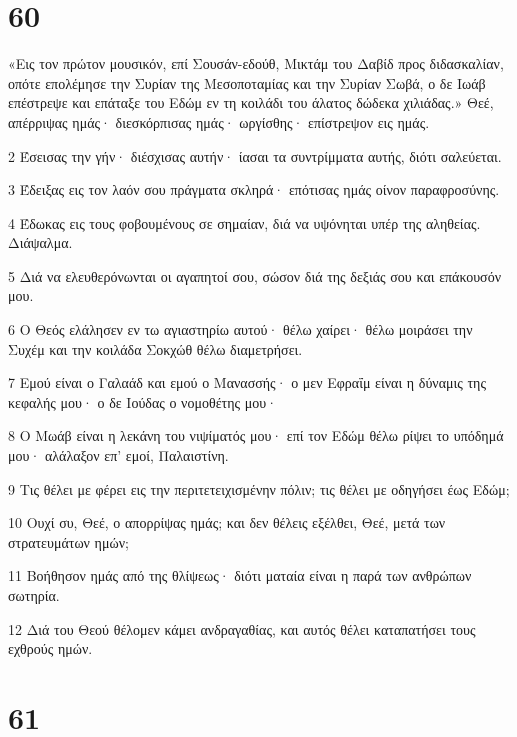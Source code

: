 \chapter{60}

\par «Εις τον πρώτον μουσικόν, επί Σουσάν-εδούθ, Μικτάμ του Δαβίδ προς διδασκαλίαν, οπότε επολέμησε την Συρίαν της Μεσοποταμίας και την Συρίαν Σωβά, ο δε Ιωάβ επέστρεψε και επάταξε του Εδώμ εν τη κοιλάδι του άλατος δώδεκα χιλιάδας.» Θεέ, απέρριψας ημάς· διεσκόρπισας ημάς· ωργίσθης· επίστρεψον εις ημάς.
\par 2 Έσεισας την γήν· διέσχισας αυτήν· ίασαι τα συντρίμματα αυτής, διότι σαλεύεται.
\par 3 Έδειξας εις τον λαόν σου πράγματα σκληρά· επότισας ημάς οίνον παραφροσύνης.
\par 4 Έδωκας εις τους φοβουμένους σε σημαίαν, διά να υψόνηται υπέρ της αληθείας. Διάψαλμα.
\par 5 Διά να ελευθερόνωνται οι αγαπητοί σου, σώσον διά της δεξιάς σου και επάκουσόν μου.
\par 6 Ο Θεός ελάλησεν εν τω αγιαστηρίω αυτού· θέλω χαίρει· θέλω μοιράσει την Συχέμ και την κοιλάδα Σοκχώθ θέλω διαμετρήσει.
\par 7 Εμού είναι ο Γαλαάδ και εμού ο Μανασσής· ο μεν Εφραΐμ είναι η δύναμις της κεφαλής μου· ο δε Ιούδας ο νομοθέτης μου·
\par 8 Ο Μωάβ είναι η λεκάνη του νιψίματός μου· επί τον Εδώμ θέλω ρίψει το υπόδημά μου· αλάλαξον επ' εμοί, Παλαιστίνη.
\par 9 Τις θέλει με φέρει εις την περιτετειχισμένην πόλιν; τις θέλει με οδηγήσει έως Εδώμ;
\par 10 Ουχί συ, Θεέ, ο απορρίψας ημάς; και δεν θέλεις εξέλθει, Θεέ, μετά των στρατευμάτων ημών;
\par 11 Βοήθησον ημάς από της θλίψεως· διότι ματαία είναι η παρά των ανθρώπων σωτηρία.
\par 12 Διά του Θεού θέλομεν κάμει ανδραγαθίας, και αυτός θέλει καταπατήσει τους εχθρούς ημών.

\chapter{61}

